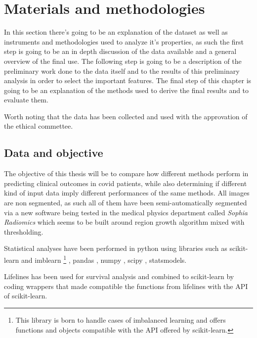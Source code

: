 \chapter{Materials and methodologies}\label{cap: Material_method}
In this section there's going to be an explanation of the dataset as well as instruments and methodologies used to analyze it's properties, as such the first step is going to be an in depth discussion of the data available and a general overview of the final use. The following step is going to be a description of the preliminary work done to the data itself and to the results of this preliminary analysis in order to select the important features. The final step of this chapter is going to be an explanation of the methods used to derive the final results and to evaluate them.

Worth noting that the data has been collected and used with the approvation of the ethical commettee.


\section{Data and objective}
\label{chap:freefree}
The objective of this thesis will be to compare how different methods perform in predicting clinical outcomes in covid patients, while also determining if different kind of input data imply different performances of the same methods.
All images are non segmented, as such all of them have been semi-automatically segmented via a new software being tested in the medical physics department called \textit{Sophia Radiomics} \cite{Sophiarad} which seems to be built around region growth algorithm mixed with thresholding. 

Statistical analyses have been performed in python using libraries such as scikit-learn \cite{sklearn} and imblearn
\footnote{This library is born to handle cases of imbalanced learning and offers functions and objects compatible with the API offered by scikit-learn.} \cite{imblearn}, pandas \cite{pandas}, numpy \cite{numpy}, scipy \cite{scipy}, statsmodels\cite{statsmodels}.

Lifelines \cite{lifelines} has been used for survival analysis and combined to scikit-learn by coding wrappers that made compatible the functions from lifelines with the API of scikit-learn.

